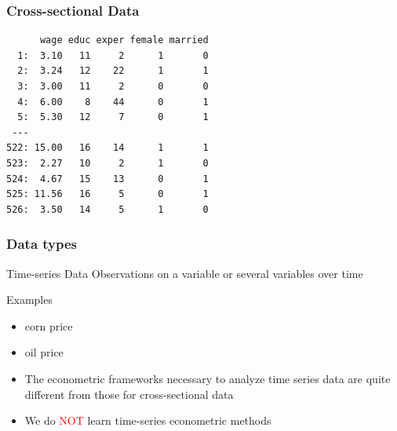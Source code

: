 \documentclass[fleqn]{beamer}\usepackage[]{graphicx}\usepackage[]{color}
\makeatletter
\newenvironment{kframe}{%
 \def\at@end@of@kframe{}%
 \ifinner\ifhmode%
  \def\at@end@of@kframe{\end{minipage}}%
  \begin{minipage}{\columnwidth}%
 \fi\fi%
 \def\FrameCommand##1{\hskip\@totalleftmargin \hskip-\fboxsep
 \colorbox{shadecolor}{##1}\hskip-\fboxsep
     \hskip-\linewidth \hskip-\@totalleftmargin \hskip\columnwidth}%
 \MakeFramed {\advance\hsize-\width
   \@totalleftmargin\z@ \linewidth\hsize
   \@setminipage}}%
 {\par\unskip\endMakeFramed%
 \at@end@of@kframe}
\newenvironment{knitrout}{}{} %
\makeatother
\begin{document}
\begin{frame}[c,fragile]
  \frametitle{Cross-sectional Data}

\begin{knitrout}
\color{fgcolor}\begin{kframe}
\begin{verbatim}
      wage educ exper female married
  1:  3.10   11     2      1       0
  2:  3.24   12    22      1       1
  3:  3.00   11     2      0       0
  4:  6.00    8    44      0       1
  5:  5.30   12     7      0       1
 ---                                
522: 15.00   16    14      1       1
523:  2.27   10     2      1       0
524:  4.67   15    13      0       1
525: 11.56   16     5      0       1
526:  3.50   14     5      1       0
\end{verbatim}
\end{kframe}
\end{knitrout}

\end{frame}

\begin{frame}[c]
  \frametitle{Data types}
  \begin{block}{Time-series Data}
    Observations on a variable or several variables over time
  \end{block}
  \begin{block}{Examples}
    \begin{itemize}
      \item corn price
      \item oil price
    \end{itemize}
  \end{block}
  \begin{itemize}
    \item The econometric frameworks necessary to analyze time series data are quite different from those for cross-sectional data
    \item We do \textcolor{red}{NOT} learn time-series econometric methods
  \end{itemize}
\end{frame}
\end{document}

